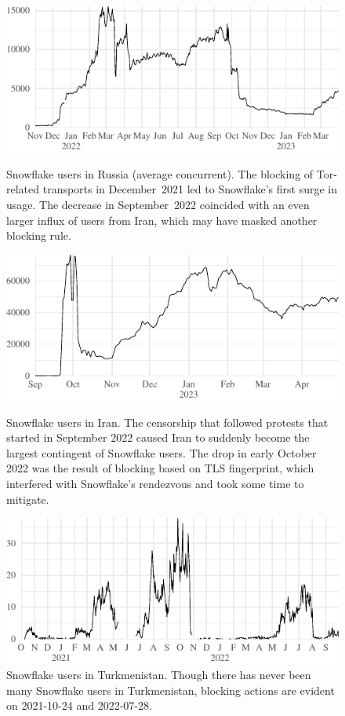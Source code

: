 \documentclass[letterpaper,twocolumn]{article}
\begin{document}
\begin{figure}[t!]
\includegraphics{figures/users/users-ru}
\caption{
Snowflake users in Russia (average concurrent).
The blocking of Tor-related transports in December~2021
led to Snowflake's first surge in usage.
The decrease in September~2022
coincided with an even larger influx of users from Iran,
which may have masked another blocking rule.
}
\label{fig:user-counts-ru}
\bigskip
\includegraphics{figures/users/users-ir}
\caption{
Snowflake users in Iran.
The censorship that followed
protests that started in September 2022
caused Iran to suddenly become the largest contingent of Snowflake users.
The drop in early October 2022
was the result of blocking based on TLS fingerprint,
which interfered with Snowflake's rendezvous
and took some time to mitigate.
}
\label{fig:user-counts-ir}
\bigskip
\includegraphics{figures/users/users-tm}
\caption{
Snowflake users in Turkmenistan.
Though there has never been many Snowflake users in Turkmenistan,
blocking actions are evident on
\mbox{2021-10-24} and \mbox{2022-07-28}.
}
\label{fig:user-counts-tm}
\end{figure}
\end{document}
